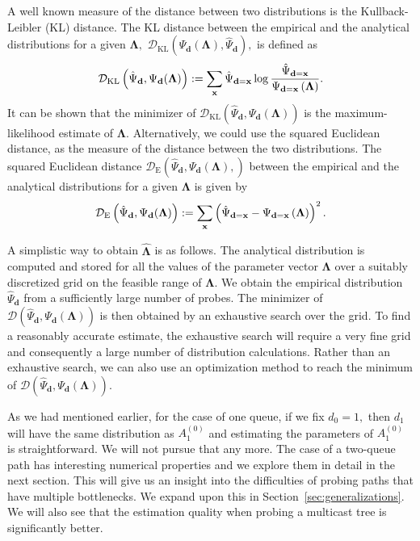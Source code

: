 \documentclass[11pt]{article}
\begin{document}
A well known measure of the distance between two distributions is the
Kullback-Leibler (KL) distance. The KL distance between the empirical
and the analytical distributions for a given $\mathbf{\Lambda},$
$\mathcal{D}_{\mathrm{KL}} \left( \Psi_\mathbf{d} (\mathbf{\Lambda}),
  \hat{\Psi}_{\mathbf{d}} \right),$ is defined as
\begin{eqnarray*}
  \mathcal{D}_{\mathrm{KL}} \left( \hat{\Psi}_{\mathbf{d}},
    \Psi_\mathbf{d} (\mathbf{\Lambda}) \right) := \sum_{\bf x}
  \hat{\Psi}_{\mathbf{d} = \mathbf{x}}  
  \log \frac{\hat{\Psi}_{\mathbf{d} = \mathbf{x}}}{\Psi_{\mathbf{d}=\mathbf{x}}
    \left(\mathbf{\Lambda}\right)}.
\end{eqnarray*}
It can be shown that the minimizer of $\mathcal{D}_{\mathrm{KL}}
\left( \hat{\Psi}_{\mathbf{d}}, \Psi_\mathbf{d} (\mathbf{\Lambda})
\right) $ is the maximum-likelihood estimate of $\mathbf{\Lambda}.$
Alternatively, we could use the squared Euclidean distance, as the
measure of the distance between the two distributions. The squared
Euclidean distance $\mathcal{D}_{\mathrm{E}} \left(
  \hat{\Psi}_{\mathbf{d}}, \Psi_\mathbf{d} (\mathbf{\Lambda}),
\right)$ between the empirical and the analytical distributions for a
given $\mathbf{\Lambda}$ is given by
\begin{eqnarray*}
  \mathcal{D}_{\mathrm{E}} \left( \hat{\Psi}_{\mathbf{d}},
    \Psi_\mathbf{d} (\mathbf{\Lambda}) \right)  := \sum_{\bf x} 
  \left( \hat{\Psi}_{\mathbf{d} = \mathbf{x}} -
    \Psi_{\mathbf{d}=\mathbf{x}}\left(\mathbf{\Lambda} \right) \right)^2 .
\end{eqnarray*}


A simplistic way to obtain $\hat{\mathbf{\Lambda}}$ is as follows. The
analytical distribution is computed and stored for all the values of
the parameter vector $\mathbf{\Lambda}$ over a suitably discretized
grid on the feasible range of $\mathbf{\Lambda}$. We obtain the
empirical distribution $\hat{\Psi}_{\mathbf{d}}$ from a sufficiently
large number of probes. The minimizer of $\mathcal{D}\left(
  \hat{\Psi}_{\mathbf{d}} , \Psi_\mathbf{d} (\mathbf{\Lambda})
\right)$ is then obtained by an exhaustive search over the grid.  To
find a reasonably accurate estimate, the exhaustive search will
require a very fine grid and consequently a large number of
distribution calculations. Rather than an exhaustive search, we can
also use an optimization method to reach the minimum of
$\mathcal{D}\left( \hat{\Psi}_{\mathbf{d}} , \Psi_\mathbf{d}
  (\mathbf{\Lambda}) \right).$

As we had mentioned earlier, for the case of one queue, if we fix
$d_0=1,$ then $d_1$ will have the same distribution as $A^{(0)}_1$ and
estimating the parameters of $A^{(0)}_1$ is straightforward. We will
not pursue that any more. The case of a two-queue path has interesting
numerical properties and we explore them in detail in the next
section. This will give us an insight into the difficulties of probing
paths that have multiple bottlenecks. We expand upon this in
Section~\ref{sec:generalizations}. We will also see that the
estimation quality when probing a multicast tree is significantly
better.
\end{document}
